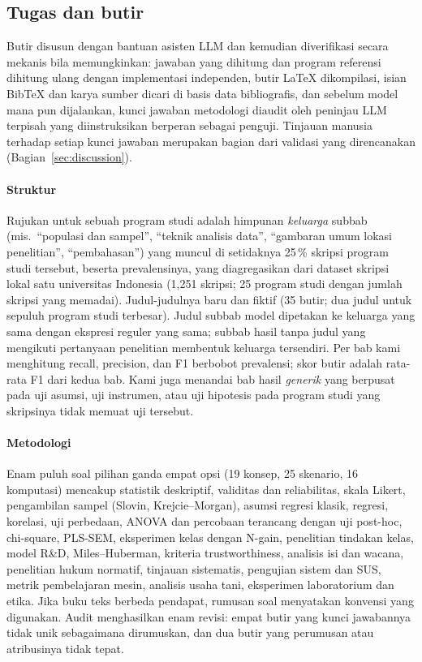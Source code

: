 \subsection{Tugas dan butir}
Butir disusun dengan bantuan asisten LLM dan kemudian diverifikasi secara mekanis bila memungkinkan: jawaban yang dihitung dan program referensi dihitung ulang dengan implementasi independen, butir LaTeX dikompilasi, isian BibTeX dan karya sumber dicari di basis data bibliografis, dan sebelum model mana pun dijalankan, kunci jawaban metodologi diaudit oleh peninjau LLM terpisah yang diinstruksikan berperan sebagai penguji. Tinjauan manusia terhadap setiap kunci jawaban merupakan bagian dari validasi yang direncanakan (Bagian~\ref{sec:discussion}).

\paragraph{Struktur} Rujukan untuk sebuah program studi adalah himpunan \emph{keluarga} subbab (mis.\ ``populasi dan sampel'', ``teknik analisis data'', ``gambaran umum lokasi penelitian'', ``pembahasan'') yang muncul di setidaknya 25\,\% skripsi program studi tersebut, beserta prevalensinya, yang diagregasikan dari dataset skripsi lokal satu universitas Indonesia (1{,}251 skripsi; 25 program studi dengan jumlah skripsi yang memadai). Judul-judulnya baru dan fiktif (35 butir; dua judul untuk sepuluh program studi terbesar). Judul subbab model dipetakan ke keluarga yang sama dengan ekspresi reguler yang sama; subbab hasil tanpa judul yang mengikuti pertanyaan penelitian membentuk keluarga tersendiri. Per bab kami menghitung recall, precision, dan F1 berbobot prevalensi; skor butir adalah rata-rata F1 dari kedua bab. Kami juga menandai bab hasil \emph{generik} yang berpusat pada uji asumsi, uji instrumen, atau uji hipotesis pada program studi yang skripsinya tidak memuat uji tersebut.

\paragraph{Metodologi} Enam puluh soal pilihan ganda empat opsi (19 konsep, 25 skenario, 16 komputasi) mencakup statistik deskriptif, validitas dan reliabilitas, skala Likert, pengambilan sampel (Slovin, Krejcie--Morgan), asumsi regresi klasik, regresi, korelasi, uji perbedaan, ANOVA dan percobaan terancang dengan uji post-hoc, chi-square, PLS-SEM, eksperimen kelas dengan N-gain, penelitian tindakan kelas, model R\&D, Miles--Huberman, kriteria trustworthiness, analisis isi dan wacana, penelitian hukum normatif, tinjauan sistematis, pengujian sistem dan SUS, metrik pembelajaran mesin, analisis usaha tani, eksperimen laboratorium dan etika. Jika buku teks berbeda pendapat, rumusan soal menyatakan konvensi yang digunakan. Audit menghasilkan enam revisi: empat butir yang kunci jawabannya tidak unik sebagaimana dirumuskan, dan dua butir yang perumusan atau atribusinya tidak tepat.

